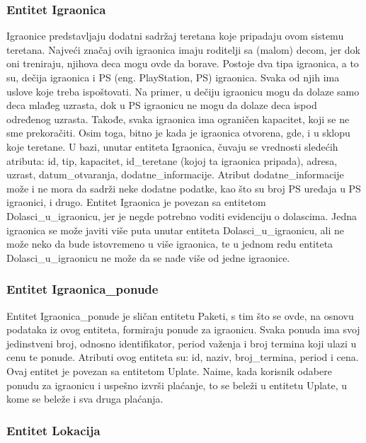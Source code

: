 \documentclass[../main.tex]{subfiles}
\begin{document}
\subsubsection{Entitet Igraonica}
Igraonice predstavljaju dodatni sadržaj teretana koje pripadaju ovom sistemu teretana. Najveći značaj ovih igraonica imaju roditelji sa (malom) decom, jer dok oni treniraju, njihova deca mogu ovde da borave. Postoje dva tipa igraonica, a to su, dečija igraonica i PS (eng. PlayStation, PS) igraonica. Svaka od njih ima uslove koje treba ispoštovati. Na primer, u dečiju igraonicu mogu da dolaze samo deca mlađeg uzrasta, dok u PS igraonicu ne mogu da dolaze deca ispod određenog uzrasta. Takođe, svaka igraonica ima ograničen kapacitet, koji se ne sme prekoračiti. Osim toga, bitno je kada je igraonica otvorena, gde, i u sklopu koje teretane.
U bazi, unutar entiteta Igraonica, čuvaju se vrednosti sledećih atributa: id, tip, kapacitet, id\_teretane (kojoj ta igraonica pripada), adresa, uzrast, datum\_otvaranja, dodatne\_informacije. Atribut dodatne\_informacije može i ne mora da sadrži neke dodatne podatke, kao što su broj PS uređaja u PS igraonici, i drugo. Entitet Igraonica je povezan sa entitetom Dolasci\_u\_igraonicu, jer je negde potrebno voditi evidenciju o dolascima. Jedna igraonica se može javiti više puta unutar entiteta Dolasci\_u\_igraonicu, ali ne može neko da bude istovremeno u više igraonica, te u jednom redu entiteta Dolasci\_u\_igraonicu ne može da se nađe više od jedne igraonice.


\subsubsection{Entitet Igraonica\_ponude}
Entitet Igraonica\_ponude je sličan entitetu Paketi, s tim što se ovde, na osnovu podataka iz ovog entiteta, formiraju ponude za igraonicu. Svaka ponuda ima svoj jedinstveni broj, odnosno identifikator, period važenja i broj termina koji ulazi u cenu te ponude. Atributi ovog entiteta su: id, naziv, broj\_termina, period i cena. Ovaj entitet je povezan sa entitetom Uplate. Naime, kada korisnik odabere ponudu za igraonicu i uspešno izvrši plaćanje, to se beleži u entitetu Uplate, u kome se beleže i sva druga plaćanja.


\subsubsection{Entitet Lokacija}
\end{document}
